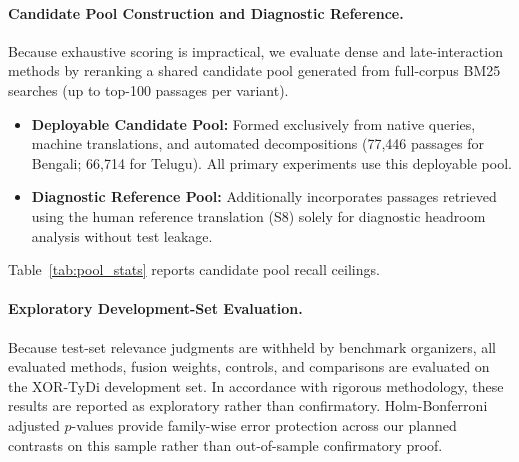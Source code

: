 \documentclass[11pt]{article}
\begin{document}
\paragraph{Candidate Pool Construction and Diagnostic Reference.} Because exhaustive scoring is impractical, we evaluate dense and late-interaction methods by reranking a shared candidate pool generated from full-corpus BM25 searches (up to top-100 passages per variant).
\begin{itemize}
    \item \textbf{Deployable Candidate Pool:} Formed exclusively from native queries, machine translations, and automated decompositions (77,446 passages for Bengali; 66,714 for Telugu). All primary experiments use this deployable pool.
    \item \textbf{Diagnostic Reference Pool:} Additionally incorporates passages retrieved using the human reference translation (S8) solely for diagnostic headroom analysis without test leakage.
\end{itemize}
Table~\ref{tab:pool_stats} reports candidate pool recall ceilings.

\paragraph{Exploratory Development-Set Evaluation.} Because test-set relevance judgments are withheld by benchmark organizers, all evaluated methods, fusion weights, controls, and comparisons are evaluated on the XOR-TyDi development set. In accordance with rigorous methodology, these results are reported as exploratory rather than confirmatory. Holm-Bonferroni adjusted $p$-values provide family-wise error protection across our planned contrasts on this sample rather than out-of-sample confirmatory proof.

\begin{table}[t]
\centering
\small
{}
\caption{Dataset and candidate pool recall ceilings ($P(\text{answer in pool})$) across deployable and diagnostic reference pools.}
\label{tab:pool_stats}
\end{table}
\end{document}
